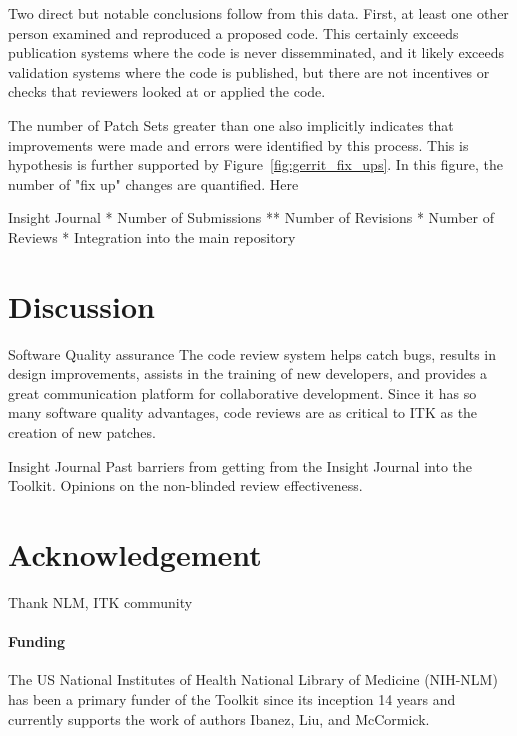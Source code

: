 \documentclass{frontiersENG} %
\begin{document}
\begin{enumeruate}
Two direct but notable conclusions follow from this data. First, at least one
other person examined and reproduced a proposed code.  This certainly exceeds
publication systems where the code is never dissemminated, and it likely
exceeds validation systems where the code is published, but there are not
incentives or checks that reviewers looked at or applied the code.

The number of Patch Sets greater than one also implicitly indicates that
improvements were made and errors were identified by this process.  This is
hypothesis is further supported by Figure~\ref{fig:gerrit_fix_ups}.  In this
figure, the number of "fix up" changes are quantified.  Here


Insight Journal
* Number of Submissions
** Number of Revisions
* Number of Reviews
* Integration into the main repository


\section{Discussion}
Software Quality assurance
The code review system helps catch bugs, results in design improvements, assists in the training of new developers, and provides a great communication platform for collaborative development. Since it has so many software quality advantages, code reviews are as critical to ITK as the creation of new patches.


Insight Journal
Past barriers from getting from the Insight Journal into the Toolkit.  Opinions on the
non-blinded review effectiveness.



\section*{Acknowledgement}
Thank NLM, ITK community


\paragraph{Funding\textcolon} The US National Institutes of Health National Library of Medicine (NIH-NLM) has been a primary funder of the Toolkit since its inception 14 years and currently supports the work of authors Ibanez, Liu, and McCormick.





\end{enumeruate}
\end{document}
